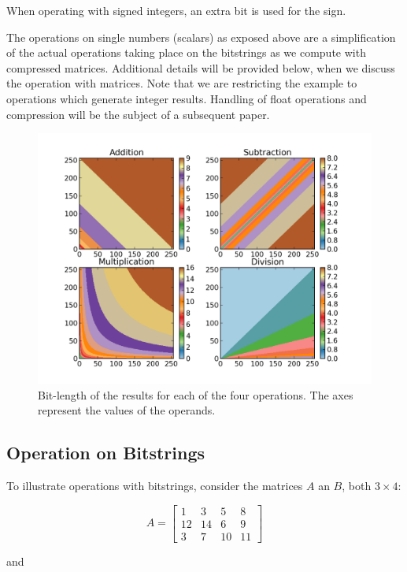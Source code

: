 \documentclass[12pt]{article}
\begin{document}
When operating with signed integers, an extra bit is used for the sign.

The operations on single numbers (scalars) as exposed above are a simplification
of the actual operations taking place on the bitstrings as we compute with 
compressed matrices. Additional details will be provided below, when we discuss 
the operation with matrices. Note that we are restricting the example to 
operations which generate integer results. Handling of float operations and 
compression will be the subject of a subsequent paper.

\begin{figure}[h]
 \centering
 \includegraphics[width=12cm]{./bitlength.png}
 \caption{Bit-length of the results for each of the four operations. The axes
represent the values of the operands.}
 \label{fig:bitlength}
\end{figure}

\subsection{Operation on Bitstrings}

To illustrate operations with bitstrings, consider the matrices $A$ an $B$,
both $3 \times 4$:

\begin{equation}
	A = \begin{bmatrix}
			1 & 3 & 5 & 8\\ 
			12 &14  & 6 & 9\\ 
			3 & 7 & 10 & 11
		\end{bmatrix}
\end{equation}

and
\end{document}
